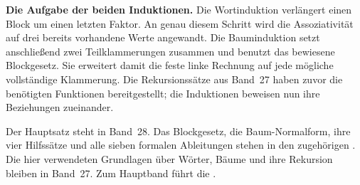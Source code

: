 \par{}
\medskip\noindent\textbf{Die Aufgabe der beiden Induktionen.}
Die Wortinduktion verlängert einen Block um einen letzten Faktor.
An genau diesem Schritt wird die Assoziativität auf drei bereits
vorhandene Werte angewandt. Die Bauminduktion setzt anschließend
zwei Teilklammerungen zusammen und benutzt das bewiesene Blockgesetz.
Sie erweitert damit die feste linke Rechnung auf jede mögliche
vollständige Klammerung. Die Rekursionssätze aus Band~27 haben zuvor
die benötigten Funktionen bereitgestellt; die Induktionen beweisen
nun ihre Beziehungen zueinander.

Der Hauptsatz steht in Band~28. Das Blockgesetz, die Baum-Normalform,
ihre vier Hilfssätze und alle sieben formalen Ableitungen stehen in den
zugehörigen \BracketingProofsLink{}.
Die hier verwendeten Grundlagen über Wörter, Bäume und ihre
Rekursion bleiben in Band~27. Zum Hauptband führt die
\BracketingNotationLink{}.
